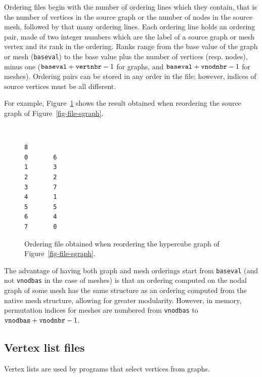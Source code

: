 Ordering files begin with the number of ordering lines which they
contain, that is the number of vertices in the source graph or the
number of nodes in the source mesh, followed by that many ordering
lines. Each ordering line holds an ordering pair, made of two integer
numbers which are the label of a source graph or mesh vertex and its
rank in the ordering. Ranks range from the base value of the graph or
mesh (\texttt{baseval}) to the base value plus the number of vertices
(resp\@. nodes), minus one ($\mbox{\texttt{baseval}} +
\mbox{\texttt{vertnbr}} - 1$ for graphs, and $\mbox{\texttt{baseval}}
+ \mbox{\texttt{vnodnbr}} - 1$ for meshes).  Ordering pairs can be
stored in any order in the file; however, indices of source vertices
must be all different.

For example, Figure~\ref{fig-file-ordering} shows the result obtained
when reordering the source graph of Figure~\ref{fig-file-sgraph}.
\begin{figure}[hbt]
\begin{center}
\begin{minipage}{3cm}
{\renewcommand{\baselinestretch}{1.05}
\footnotesize\tt
\begin{verbatim}
8
0       6
1       3
2       2
3       7
4       1
5       5
6       4
7       0
\end{verbatim}
}\end{minipage}
\end{center}
\caption{Ordering file obtained when reordering the hypercube graph of
Figure~\protect\ref{fig-file-sgraph}.}
\label{fig-file-ordering}
\end{figure}

The advantage of having both graph and mesh orderings start from
\texttt{baseval} (and not \texttt{vnodbas} in the case of meshes) is
that an ordering computed on the nodal graph of some mesh has the same
structure as an ordering computed from the native mesh structure,
allowing for greater modularity. However, in memory, permutation
indices for meshes are numbered from \texttt{vnodbas} to
$\mbox{\texttt{vnodbas}} + \mbox{\texttt{vnodnbr}} - 1$.

\subsection{Vertex list files}

Vertex lists are used by programs that select vertices from graphs.

